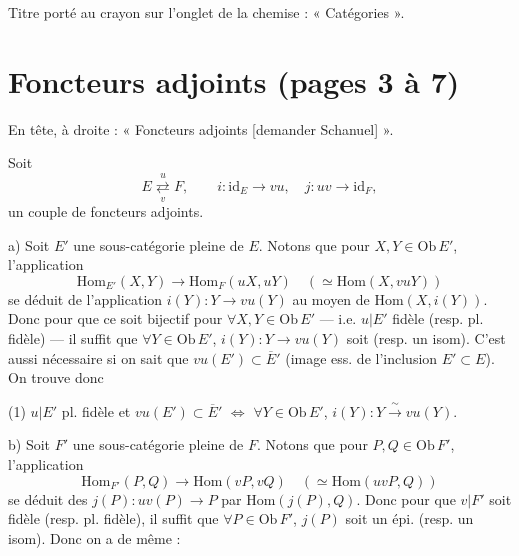 \documentclass[11pt,a4paper]{article}
\begin{document}
Titre porté au crayon sur l'onglet de la chemise : « Catégories ».

\section*{Foncteurs adjoints (pages 3 à 7)}

En tête, à droite : « Foncteurs adjoints [demander Schanuel] ».

Soit
\[
E \underset{v}{\overset{u}{\rightleftarrows}} F,
\qquad i : \mathrm{id}_E \to vu, \quad j : uv \to \mathrm{id}_F,
\]
un couple de foncteurs adjoints.

a) Soit $E'$ une sous-catégorie pleine de $E$. Notons que pour
$X, Y \in \mathrm{Ob}\,E'$, l'application
\[
\mathrm{Hom}_{E'}(X,Y) \longrightarrow \mathrm{Hom}_{F}(uX, uY)
\quad (\simeq \mathrm{Hom}(X, vuY))
\]
se déduit de l'application $i(Y) : Y \to vu(Y)$ au moyen de
$\mathrm{Hom}(X, i(Y))$. Donc pour que ce soit  bijectif\add{)}
pour $\forall X, Y \in \mathrm{Ob}\,E'$ — i.e.
$u|E'$ fidèle (resp. pl. fidèle) — il suffit que
$\forall Y \in \mathrm{Ob}\,E'$, $i(Y) : Y \to vu(Y)$ soit 
(resp. un isom). C'est aussi nécessaire si on sait que
$vu(E') \subset \overline{E}'$ (image ess. de l'inclusion $E' \subset E$).
On trouve donc

(1) $u|E'$ pl. fidèle et $vu(E') \subset \overline{E}'$
$\iff$ $\forall Y \in \mathrm{Ob}\,E'$, $i(Y) : Y \xrightarrow{\ \sim\ } vu(Y)$.


b) Soit $F'$ une sous-catégorie pleine de $F$. Notons que pour
$P, Q \in \mathrm{Ob}\,F'$, l'application
\[
\mathrm{Hom}_{F'}(P,Q) \longrightarrow \mathrm{Hom}(vP, vQ)
\quad (\simeq \mathrm{Hom}(uvP, Q))
\]
se déduit des $j(P) : uv(P) \to P$ par $\mathrm{Hom}(j(P), Q)$. Donc pour que
$v|F'$ soit fidèle (resp. pl. fidèle), il suffit que
$\forall P \in \mathrm{Ob}\,F'$, $j(P)$ soit un épi. (resp. un isom). Donc on
a de même :
\end{document}
